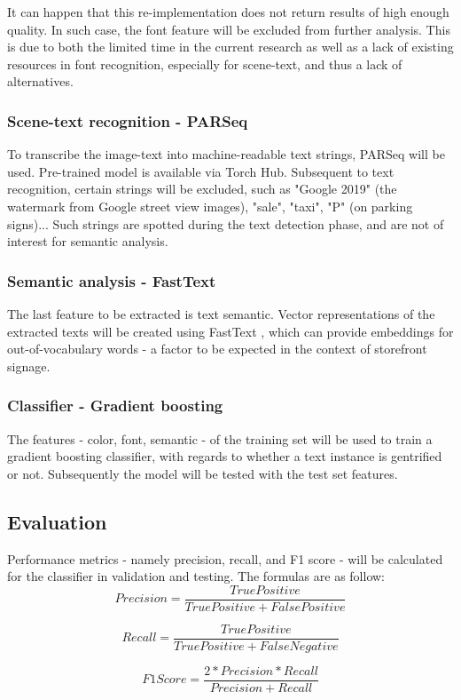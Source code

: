It can happen that this re-implementation does not return results of high enough quality. In such case, the font feature will be excluded from further analysis. This is due to both the limited time in the current research as well as a lack of existing resources in font recognition, especially for scene-text, and thus a lack of alternatives.

\subsubsection{Scene-text recognition - PARSeq}
To transcribe the image-text into machine-readable text strings, PARSeq \cite{bautista_scene_2022} will be used. Pre-trained model is available via Torch Hub. Subsequent to text recognition, certain strings will be excluded, such as "Google 2019" (the watermark from Google street view images), "sale", "taxi", "P" (on parking signs)... Such strings are spotted during the text detection phase, and are not of interest for semantic analysis.

\subsubsection{Semantic analysis - FastText}
The last feature to be extracted is text semantic. Vector representations of the extracted texts will be created using FastText \cite{bojanowski_enriching_2017}, which can provide embeddings for out-of-vocabulary words - a factor to be expected in the context of storefront signage.

\subsubsection{Classifier - Gradient boosting}
The features - color, font, semantic - of the training set will be used to train a gradient boosting classifier, with regards to whether a text instance is gentrified or not. Subsequently the model will be tested with the test set features.

\subsection{Evaluation}
Performance metrics - namely precision, recall, and F1 score - will be calculated for the classifier in validation and testing. The formulas are as follow:
\[Precision = \frac{True Positive}{True Positive + False Positive}\]

\[Recall = \frac{True Positive}{True Positive + False Negative}\]

\[F1 Score = \frac{2 * Precision * Recall}{Precision + Recall}\]
